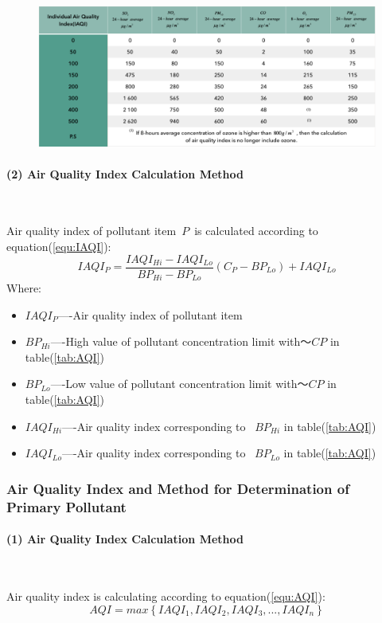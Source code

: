 \documentclass[a4paper,11pt]{article}
\begin{document}
\begin{figure} [htpb]
\centering
\includegraphics[width=16cm]{./Pic/AQItable.pdf}
\label{fig:graph}
\end{figure}

\paragraph {(2) Air Quality Index Calculation Method}
\textrm{\\}
\par Air quality index of pollutant item~$P$~is calculated according to equation(\ref{equ:IAQI}):
\begin{equation}
IAQI_{P}=\frac{IAQI_{Hi}-IAQI_{Lo}}{BP_{Hi}-BP_{Lo}}(C_{P}-BP_{Lo})+IAQI_{Lo}
\label{equ:IAQI} 
\end{equation}
Where:
\begin{itemize}
\item $IAQI_{P}$----Air quality index of pollutant item
\item $BP_{Hi}$----High value of pollutant concentration limit with～$CP$ in table(\ref{tab:AQI})
\item $BP_{Lo}$----Low value of pollutant concentration limit with～$CP$ in table(\ref{tab:AQI})
\item $IAQI_{Hi}$----Air quality index corresponding to ~$BP_{Hi}$ in table(\ref{tab:AQI})
\item $IAQI_{Lo}$----Air quality index corresponding to ~$BP_{Lo}$ in table(\ref{tab:AQI})
\end{itemize}



\subsubsection{Air Quality Index and Method for Determination of Primary Pollutant}
\paragraph {(1) Air Quality Index Calculation Method}
\textrm{\\}
\par Air quality index is calculating according to equation(\ref{equ:AQI}):
\begin{equation}
AQI=max\left \{{IAQI_{1},IAQI_{2},IAQI_{3},...,IAQI_{n}}  \right \}
\label{equ:AQI}
\end{equation}
\end{document}
